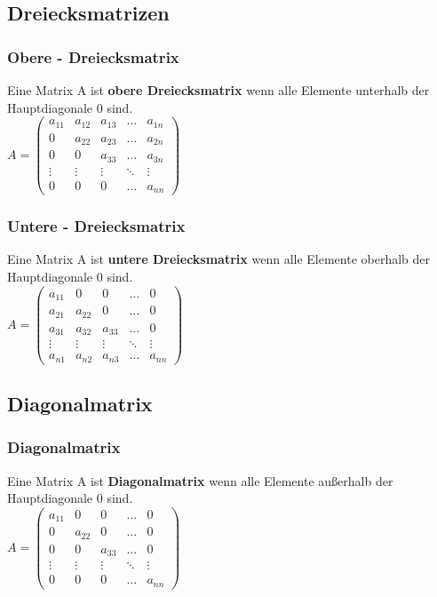 \subsection{Dreiecksmatrizen}
\begin{frame}
\frametitle{Obere - Dreiecksmatrix}
Eine Matrix A ist \textbf{obere Dreiecksmatrix} wenn alle Elemente unterhalb der Hauptdiagonale 0 sind.\\
$A = \begin{pmatrix}
a_{11} & a_{12} & a_{13} & \dots & a_{1n}\\
0 & a_{22} & a_{23} & \dots & a_{2n}\\
0 & 0 & a_{33} & \dots & a_{3n}\\
\vdots & \vdots & \vdots & \ddots & \vdots\\
0 & 0 & 0 & \dots & a_{nn}
\end{pmatrix}$
\end{frame}

\begin{frame}
\frametitle{Untere - Dreiecksmatrix}
Eine Matrix A ist \textbf{untere Dreiecksmatrix} wenn alle Elemente oberhalb der Hauptdiagonale 0 sind.\\
$A = \begin{pmatrix}
a_{11} & 0 & 0 & \dots & 0\\
a_{21} & a_{22} & 0 & \dots & 0\\
a_{31} & a_{32} & a_{33} & \dots & 0\\
\vdots & \vdots & \vdots & \ddots & \vdots\\
a_{n1} & a_{n2} & a_{n3} & \dots & a_{nn}
\end{pmatrix}$
\end{frame}

\subsection{Diagonalmatrix}
\begin{frame}
\frametitle{Diagonalmatrix}
Eine Matrix A ist \textbf{Diagonalmatrix} wenn alle Elemente außerhalb der Hauptdiagonale 0 sind.\\
$A = \begin{pmatrix}
a_{11} & 0 & 0 & \dots & 0\\
0 & a_{22} & 0 & \dots & 0\\
0 & 0 & a_{33} & \dots & 0\\
\vdots & \vdots & \vdots & \ddots & \vdots\\
0 & 0 & 0 & \dots & a_{nn}
\end{pmatrix}$
\end{frame}


